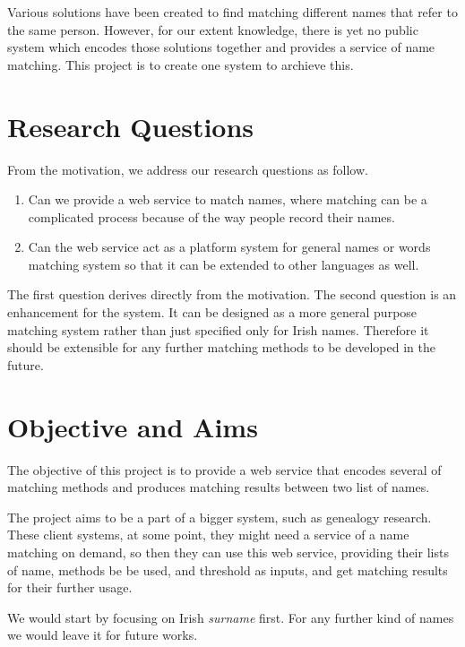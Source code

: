 Various solutions have been created to find
matching different names that refer to the same person. However,
for our extent knowledge, there is yet no public system which encodes
those solutions together and provides a service of name matching.
This project is to create one system to archieve this.

\pagebreak

\section{Research Questions}
\label{sec:rq}

From the motivation, we address our research questions as follow.

\begin{enumerate}
  \item Can we provide a web service to match names, where matching can be
    a complicated process because of the way people record their names.
  \item Can the web service act as a platform system for general names or words
    matching system so that it can be extended to other languages as well.
\end{enumerate}

The first question derives directly from the motivation.
The second question is an enhancement for the system. It can be designed
as a more general purpose matching system rather than just specified
only for Irish names. Therefore it should be extensible for any further
matching methods to be developed in the future.

\section{Objective and Aims}

The objective of this project is to provide a web service that
encodes several of matching methods and produces matching
results between two list of names.

The project aims to be a part of a bigger system, such as
genealogy research. These client systems, at some point,
they might need a service of a name matching on demand, so then they can use this
web service, providing their lists of name, methods be be used,
and threshold as inputs, and get matching results for their further usage.

We would start by focusing on Irish \textit{surname} first.
For any further kind of names we would leave it for future works.

